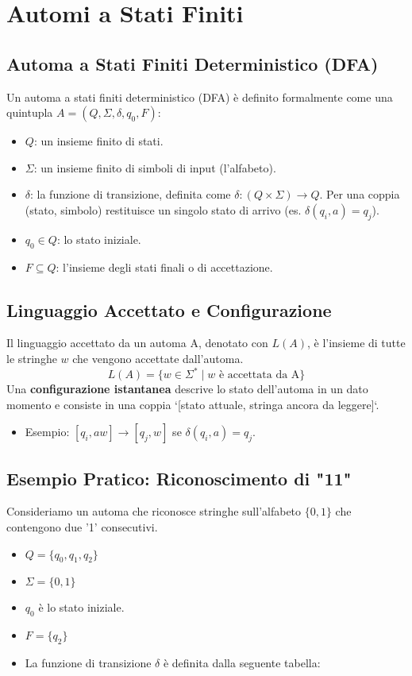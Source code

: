 \section{Automi a Stati Finiti}

\subsection{Automa a Stati Finiti Deterministico (DFA)}
Un automa a stati finiti deterministico (DFA) è definito formalmente come una quintupla $A = (Q, \Sigma, \delta, q_0, F)$:
\begin{itemize}
    \item $Q$: un insieme finito di stati.
    \item $\Sigma$: un insieme finito di simboli di input (l'alfabeto).
    \item $\delta$: la funzione di transizione, definita come $\delta: (Q \times \Sigma) \rightarrow Q$. Per una coppia (stato, simbolo) restituisce un singolo stato di arrivo (es. $\delta(q_i, a) = q_j$).
    \item $q_0 \in Q$: lo stato iniziale.
    \item $F \subseteq Q$: l'insieme degli stati finali o di accettazione.
\end{itemize}

\subsection{Linguaggio Accettato e Configurazione}
Il linguaggio accettato da un automa A, denotato con $L(A)$, è l'insieme di tutte le stringhe $w$ che vengono accettate dall'automa.
\[ L(A) = \{ w \in \Sigma^* \mid w \text{ è accettata da A} \} \]
Una \textbf{configurazione istantanea} descrive lo stato dell'automa in un dato momento e consiste in una coppia `[stato attuale, stringa ancora da leggere]`.
\begin{itemize}
    \item Esempio: $[q_i, aw] \rightarrow [q_j, w]$ se $\delta(q_i, a) = q_j$.
\end{itemize}

\subsection{Esempio Pratico: Riconoscimento di "11"}
Consideriamo un automa che riconosce stringhe sull'alfabeto $\{0, 1\}$ che contengono due '1' consecutivi.
\begin{itemize}
    \item $Q = \{q_0, q_1, q_2\}$
    \item $\Sigma = \{0, 1\}$
    \item $q_0$ è lo stato iniziale.
    \item $F = \{q_2\}$
    \item La funzione di transizione $\delta$ è definita dalla seguente tabella:
\end{itemize}

